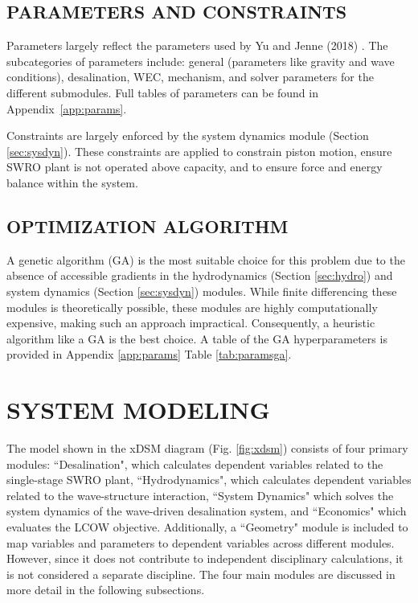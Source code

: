 \documentclass[twocolumn,10pt]{asme2e}
\begin{document}
\subsection{PARAMETERS AND CONSTRAINTS}
Parameters largely reflect the parameters used by Yu and Jenne (2018) \cite{Yu2018}. The subcategories of parameters include: general (parameters like gravity and wave conditions), desalination, WEC, mechanism, and solver parameters for the different submodules. Full tables of parameters can be found in Appendix~\ref{app:params}.

Constraints are largely enforced by the system dynamics module (Section \ref{sec:sysdyn}). These constraints are applied to constrain piston motion, ensure SWRO plant is not operated above capacity, and to ensure force and energy balance within the system.

\subsection{OPTIMIZATION ALGORITHM}
A genetic algorithm (GA) is the most suitable choice for this problem due to the absence of accessible gradients in the hydrodynamics (Section \ref{sec:hydro}) and system dynamics (Section \ref{sec:sysdyn}) modules. While finite differencing these modules is theoretically possible, these modules are highly computationally expensive, making such an approach impractical. Consequently, a heuristic algorithm like a GA is the best choice. A table of the GA hyperparameters is provided in Appendix \ref{app:params} Table \ref{tab:paramsga}.

\section{SYSTEM MODELING} \label{sec:sysmodel}
The model shown in the xDSM diagram (Fig. \ref{fig:xdsm}) consists of four primary modules: ``Desalination", which calculates dependent variables related to the single-stage SWRO plant, ``Hydrodynamics", which calculates dependent variables related to the wave-structure interaction, ``System Dynamics" which solves the system dynamics of the wave-driven desalination system, and ``Economics" which evaluates the LCOW objective. Additionally, a ``Geometry" module is included to map variables and parameters to dependent variables across different modules. However, since it does not contribute to independent disciplinary calculations, it is not considered a separate discipline. The four main modules are discussed in more detail in the following subsections. 
\end{document}
